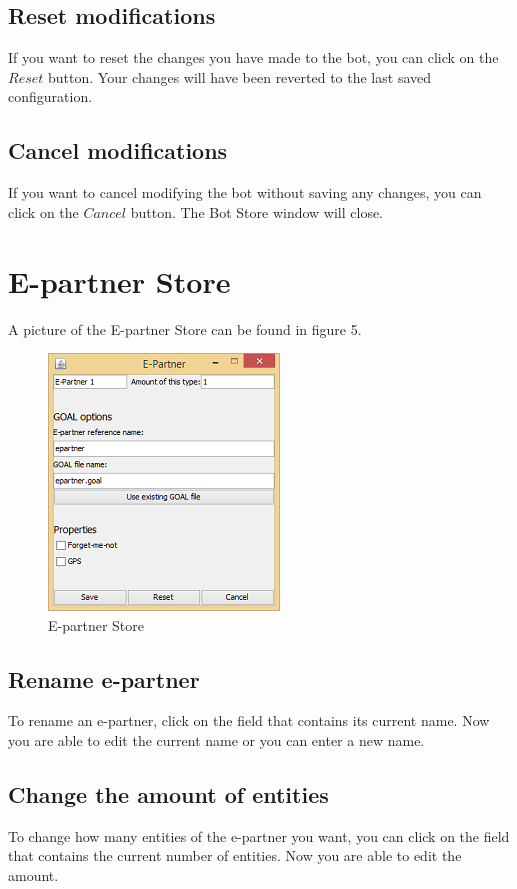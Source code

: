 \documentclass[a4paper]{article}
\begin{document}
\subsection{Reset modifications}
If you want to reset the changes you have made to the bot, you can click on the $Reset$ button. Your changes will have been reverted to the last saved configuration.

\subsection{Cancel modifications}
If you want to cancel modifying the bot without saving any changes, you can click on the $Cancel$ button. The Bot Store window will close.

\section{E-partner Store}
A picture of the E-partner Store can be found in figure 5.
\begin{figure}[h]
\begin{center}
\includegraphics{es.png}
\end{center}
\caption{E-partner Store}
\end{figure}
\subsection{Rename e-partner}
To rename an e-partner, click on the field that contains its current name. Now you are able to edit the current name or you can enter a new name.

\subsection{Change the amount of entities}
To change how many entities of the e-partner you want, you can click on the field that contains the current number of entities. Now you are able to edit the amount.
\end{document}
